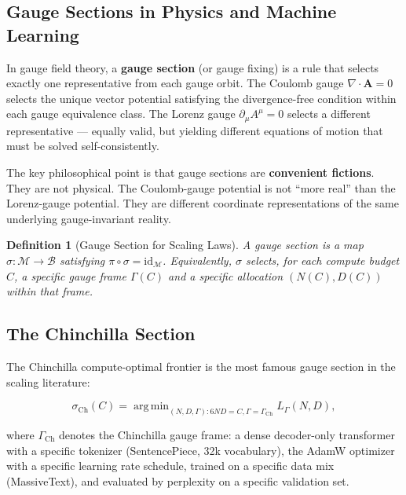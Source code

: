 \documentclass[12pt,a4paper]{article}
\newtheorem{definition}[theorem]{Definition}
\theoremstyle{remark}
\DeclareMathOperator{\argmin}{arg\,min}
\newcommand{\Loss}{L}
\begin{document}
\subsection{Gauge Sections in Physics and Machine Learning}

In gauge field theory, a \textbf{gauge section} (or gauge fixing) is a rule that selects exactly one representative from each gauge orbit. The Coulomb gauge $\nabla \cdot \mathbf{A} = 0$ selects the unique vector potential satisfying the divergence-free condition within each gauge equivalence class. The Lorenz gauge $\partial_\mu A^\mu = 0$ selects a different representative — equally valid, but yielding different equations of motion that must be solved self-consistently.

The key philosophical point is that gauge sections are \textbf{convenient fictions}. They are not physical. The Coulomb-gauge potential is not ``more real'' than the Lorenz-gauge potential. They are different coordinate representations of the same underlying gauge-invariant reality.

\begin{definition}[Gauge Section for Scaling Laws]
\label{def:section}
A gauge section is a map $\sigma: \mathcal{M} \to \mathcal{B}$ satisfying $\pi \circ \sigma = \text{id}_\mathcal{M}$. Equivalently, $\sigma$ selects, for each compute budget $C$, a specific gauge frame $\Gamma(C)$ and a specific allocation $(N(C), D(C))$ within that frame.
\end{definition}

\subsection{The Chinchilla Section}

The Chinchilla compute-optimal frontier is the most famous gauge section in the scaling literature:

\begin{equation}
\sigma_{\text{Ch}}(C) = \argmin_{(N,D,\Gamma): 6ND = C, \Gamma = \Gamma_{\text{Ch}}} \Loss_\Gamma(N, D),
\label{eq:chinchilla_section}
\end{equation}

where $\Gamma_{\text{Ch}}$ denotes the Chinchilla gauge frame: a dense decoder-only transformer with a specific tokenizer (SentencePiece, 32k vocabulary), the AdamW optimizer with a specific learning rate schedule, trained on a specific data mix (MassiveText), and evaluated by perplexity on a specific validation set.
\end{document}
